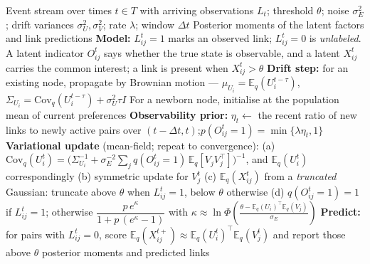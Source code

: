 \documentclass{article}
\begin{document}
\begin{algorithm}[!h]
\renewcommand{\algorithmicrequire}{\textbf{Input:}}
\renewcommand{\algorithmicensure}{\textbf{Output:}}
	\caption{SPU: positive-unlabeled learning in streaming networks}
	\begin{algorithmic}[1]
	    \REQUIRE
	    Event stream over times $t\in T$ with arriving observations $L_{t}$;
	    threshold $\theta$; noise $\sigma_{E}^{2}$; drift variances $\sigma_{U}^{2},\sigma_{V}^{2}$;
	    rate $\lambda$; window $\Delta t$
	    \ENSURE
	    Posterior moments of the latent factors and link predictions
	    \STATE \textbf{Model:} $L_{ij}^{t}=1$ marks an observed link; $L_{ij}^{t}=0$ is
	    \emph{unlabeled}. A latent indicator $O_{ij}^{t}$ says whether the true state is
	    observable, and a latent $X_{ij}^{t}$ carries the common interest;
	    a link is present when $X_{ij}^{t}>\theta$ %
	    \STATE \textbf{Drift step:} for an existing node, propagate by Brownian motion ---
	    $\mu_{U_{i}}=\mathbb{E}_{q}(U_{i}^{t-\tau})$,\quad
	    $\Sigma_{U_{i}}=\mathrm{Cov}_{q}(U_{i}^{t-\tau})+\sigma_{U}^{2}\tau I$ %
	    \STATE \quad For a newborn node, initialise at the population mean of current preferences
	    \STATE \textbf{Observability prior:}
	    $\eta_{t}\leftarrow$ the recent ratio of new links to newly active pairs over
	    $(t-\Delta t,t)$;\quad $p(O_{ij}^{t}=1)=\min\{\lambda\eta_{t},1\}$
	    \STATE \textbf{Variational update} (mean-field; repeat to convergence):
	    \STATE \quad (a) $\mathrm{Cov}_{q}(U_{i}^{t})=\Big(\Sigma_{U_{i}}^{-1}
	    +\sigma_{E}^{-2}\sum_{j}q(O_{ij}^{t}=1)\,\mathbb{E}_{q}\!\left[V_{j}V_{j}^{\top}\right]\Big)^{-1}$,
	    and $\mathbb{E}_{q}(U_{i}^{t})$ correspondingly %
	    \STATE \quad (b) symmetric update for $V_{j}^{t}$
	    \STATE \quad (c) $\mathbb{E}_{q}(X_{ij}^{t})$ from a \emph{truncated} Gaussian: truncate
	    above $\theta$ when $L_{ij}^{t}=1$, below $\theta$ otherwise %
	    \STATE \quad (d) $q(O_{ij}^{t}=1)=1$ if $L_{ij}^{t}=1$; otherwise
	    $\dfrac{p\,e^{\kappa}}{1+p\,(e^{\kappa}-1)}$ with
	    $\kappa\approx\ln\Phi\!\left(\frac{\theta-\mathbb{E}_{q}(U_{i})^{\top}\mathbb{E}_{q}(V_{j})}{\sigma_{E}}\right)$
	    \STATE \textbf{Predict:} for pairs with $L_{ij}^{t}=0$, score
	    $\mathbb{E}_{q}(X_{ij}^{t+})\approx \mathbb{E}_{q}(U_{i}^{t})^{\top}\mathbb{E}_{q}(V_{j}^{t})$
	    and report those above $\theta$
	    \ENDFOR
		\RETURN posterior moments and predicted links
	\end{algorithmic}
\end{algorithm}
\end{document}
